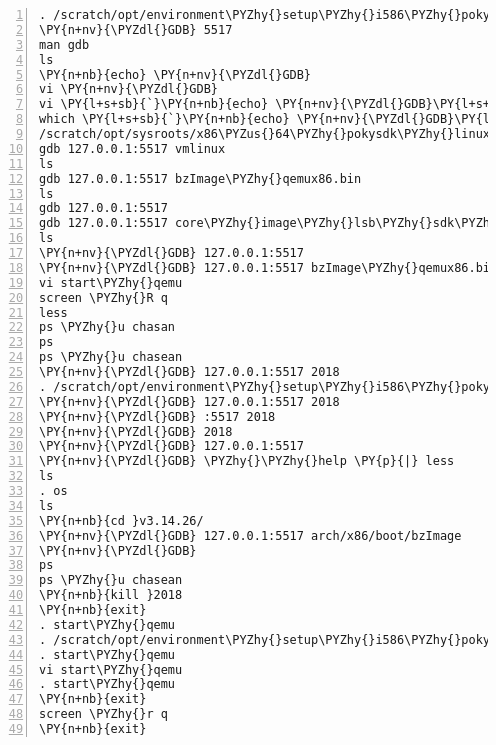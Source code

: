 \begin{Verbatim}[commandchars=\\\{\},numbers=left,firstnumber=1,stepnumber=1]
. /scratch/opt/environment\PYZhy{}setup\PYZhy{}i586\PYZhy{}poky\PYZhy{}linux
\PY{n+nv}{\PYZdl{}GDB} 5517
man gdb
ls
\PY{n+nb}{echo} \PY{n+nv}{\PYZdl{}GDB}
vi \PY{n+nv}{\PYZdl{}GDB}
vi \PY{l+s+sb}{`}\PY{n+nb}{echo} \PY{n+nv}{\PYZdl{}GDB}\PY{l+s+sb}{`}
which \PY{l+s+sb}{`}\PY{n+nb}{echo} \PY{n+nv}{\PYZdl{}GDB}\PY{l+s+sb}{`}
/scratch/opt/sysroots/x86\PYZus{}64\PYZhy{}pokysdk\PYZhy{}linux/usr/bin/i586\PYZhy{}poky\PYZhy{}linux/i586\PYZhy{}poky\PYZhy{}linux\PYZhy{}gdb \PYZhy{}\PYZhy{}help
gdb 127.0.0.1:5517 vmlinux
ls
gdb 127.0.0.1:5517 bzImage\PYZhy{}qemux86.bin 
ls
gdb 127.0.0.1:5517 
gdb 127.0.0.1:5517 core\PYZhy{}image\PYZhy{}lsb\PYZhy{}sdk\PYZhy{}qemux86.ext3 
ls
\PY{n+nv}{\PYZdl{}GDB} 127.0.0.1:5517
\PY{n+nv}{\PYZdl{}GDB} 127.0.0.1:5517 bzImage\PYZhy{}qemux86.bin 
vi start\PYZhy{}qemu 
screen \PYZhy{}R q
less
ps \PYZhy{}u chasan
ps 
ps \PYZhy{}u chasean
\PY{n+nv}{\PYZdl{}GDB} 127.0.0.1:5517 2018
. /scratch/opt/environment\PYZhy{}setup\PYZhy{}i586\PYZhy{}poky\PYZhy{}linux
\PY{n+nv}{\PYZdl{}GDB} 127.0.0.1:5517 2018
\PY{n+nv}{\PYZdl{}GDB} :5517 2018
\PY{n+nv}{\PYZdl{}GDB} 2018
\PY{n+nv}{\PYZdl{}GDB} 127.0.0.1:5517 
\PY{n+nv}{\PYZdl{}GDB} \PYZhy{}\PYZhy{}help \PY{p}{|} less
ls
. os
ls
\PY{n+nb}{cd }v3.14.26/
\PY{n+nv}{\PYZdl{}GDB} 127.0.0.1:5517 arch/x86/boot/bzImage 
\PY{n+nv}{\PYZdl{}GDB}
ps
ps \PYZhy{}u chasean
\PY{n+nb}{kill }2018
\PY{n+nb}{exit}
. start\PYZhy{}qemu 
. /scratch/opt/environment\PYZhy{}setup\PYZhy{}i586\PYZhy{}poky\PYZhy{}linux
. start\PYZhy{}qemu 
vi start\PYZhy{}qemu 
. start\PYZhy{}qemu 
\PY{n+nb}{exit}
screen \PYZhy{}r q
\PY{n+nb}{exit}
\end{Verbatim}
